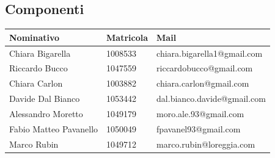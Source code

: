 \subsection{Componenti}
	\begin{center}
	\begin{tabu} to \textwidth {|X[4]|X[2c]|X[5]|}
	\hline
     Nominativo & Matricola & Mail \\ \hline
     Chiara Bigarella & 1008533 & chiara.bigarella1@gmail.com \\ \hline
     Riccardo Bucco & 1047559 & riccardobucco@gmail.com \\ \hline
     Chiara Carlon & 1003882 & chiara.carlon@gmail.com \\ \hline
     Davide Dal Bianco & 1053442 & dal.bianco.davide@gmail.com \\ \hline
     Alessandro Moretto & 1049179 & moro.ale.93@gmail.com \\ \hline
     Fabio Matteo Pavanello & 1050049 & fpavanel93@gmail.com \\ \hline
     Marco Rubin & 1049712 & marco.rubin@loreggia.com \\ \hline
     \end{tabu}
	\end{center}